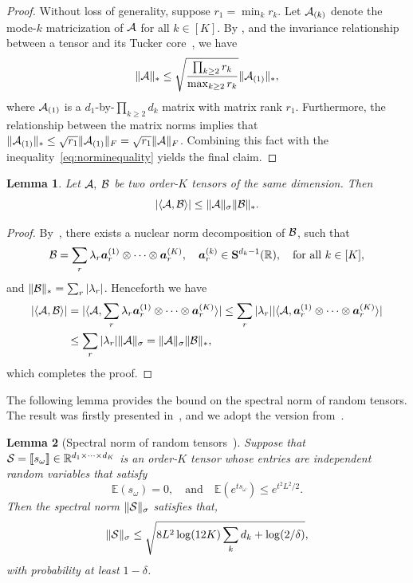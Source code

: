 \documentclass{article}
\theoremstyle{plain}
\newtheorem{lem}{Lemma}
\theoremstyle{definition}
\begin{document}
\begin{proof}
Without loss of generality, suppose $r_1=\min_k r_k$. Let $\mathcal{A}_{(k)}$ denote the mode-$k$ matricization of $\mathcal{A}$ for all $k\in[K]$. By \citet[Corollary 4.11]{wang2017operator}, and the invariance relationship between a tensor and its Tucker core~\citep[Section 6]{jiang2017tensor}, we have
\begin{equation}\label{eq:norminequality}
\lVert\mathcal{A}\rVert_* \leq \sqrt{\prod_{k\geq 2} r_k \over \max_{k\geq 2} r_k} \lVert\mathcal{A}_{(1)}\rVert_*,
\end{equation}
where $\mathcal{A}_{(1)}$ is a $d_1$-by-$\prod_{k\geq 2}d_k$ matrix with matrix rank $r_1$. Furthermore, the relationship between the matrix norms implies that $\lVert\mathcal{A}_{(1)}\rVert_*\leq \sqrt{r_1}\lVert\mathcal{A}_{(1)}\rVert_F=\sqrt{r_1}\lVert\mathcal{A}\rVert_F$. Combining this fact with the inequality~\eqref{eq:norminequality} yields the final claim.
\end{proof}



\begin{lem} \label{lem:inq}
Let $\mathcal{A}, \; \mathcal{B}$ be two order-$K$ tensors of the same dimension. Then
\[
|\langle \mathcal{A},\mathcal{B}\rangle| \leq \lVert\mathcal{A}\rVert_\sigma   \lVert\mathcal{B}\rVert_*.
\]
\end{lem}

\begin{proof}
By~\citet[Proposition 3.1]{friedland2018nuclear}, there exists a nuclear norm decomposition of $\mathcal{B}$, such that
\[
\mathcal{B}=\sum_{r} \lambda_r \bm{a}^{(1)}_r\otimes \cdots\otimes \bm{a}^{(K)}_r,\quad \bm{a}_r^{(k)}\in\mathbf{S}^{d_k-1}(\mathbb{R}),\quad \text{for all }k\in[K],
\]
and $\lVert\mathcal{B}\rVert_*=\sum_{r}|\lambda_r|$. Henceforth we have
\begin{align*}
|\langle \mathcal{A},\mathcal{B}\rangle|&=| \langle \mathcal{A}, \sum_{r} \lambda_r \bm{a}^{(1)}_r\otimes \cdots\otimes \bm{a}^{(K)}_r \rangle|\leq \sum_r |\lambda_r| |\langle \mathcal{A}, \bm{a}^{(1)}_r \otimes \cdots\otimes \bm{a}^{(K)}_r \rangle|\\
&\leq \sum_{r}|\lambda_r| \lVert\mathcal{A}\rVert_\sigma= \lVert\mathcal{A}\rVert_\sigma\lVert\mathcal{B}\rVert_*,
\end{align*}
which completes the proof.
\end{proof}


The following lemma provides the bound on the spectral norm of random tensors. The result was firstly presented in~\citet{nguyen2015tensor}, and we adopt the version from~\citet{tomioka2014spectral}.
\begin{lem}[Spectral norm of random tensors~\citep{tomioka2014spectral}]\label{lem:tensor}
Suppose that $\mathcal{S}=\llbracket s_{\omega} \rrbracket\in\mathbb{R}^{d_1\times \cdots \times d_K}$ is an order-$K$ tensor whose entries are independent random variables that satisfy
\[
\mathbb{E}(s_{\omega})=0,\quad \text{and} \quad\mathbb{E}(e^{ts_{\omega}})\leq e^{t^2L^2/2}.
\]
Then the spectral norm $\lVert\mathcal{S}\rVert_\sigma$ satisfies that,
\[
\lVert\mathcal{S}\rVert_\sigma\leq \sqrt{{8L^2} \log (12K) \sum_k d_k +\log (2/\delta)},
\]
with probability at least $1-\delta$.
\end{lem}
\end{document}
